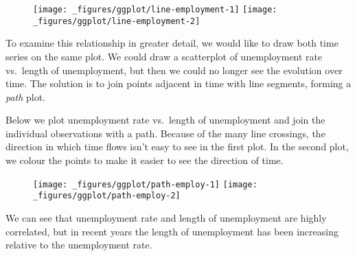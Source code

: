 \begin{figure}[H]
  \texttt{[image: \_figures/ggplot/line-employment-1]}%
  \texttt{[image: \_figures/ggplot/line-employment-2]}
\end{figure}

To examine this relationship in greater detail, we would like to draw
both time series on the same plot. We could draw a scatterplot of
unemployment rate vs.~length of unemployment, but then we could no
longer see the evolution over time. The solution is to join points
adjacent in time with line segments, forming a \emph{path} plot.

Below we plot unemployment rate vs.~length of unemployment and join the
individual observations with a path. Because of the many line crossings,
the direction in which time flows isn't easy to see in the first plot.
In the second plot, we colour the points to make it easier to see the
direction of time.

\begin{Shaded}
\begin{Highlighting}[]
\OperatorTok{/}\StringTok{ }\OperatorTok{+}\StringTok{ }
\StringTok{  }\NormalTok{() }\OperatorTok{+}
\StringTok{  }\NormalTok{()}

\StringTok{ }\OperatorTok{$}\OperatorTok{+}\StringTok{ }
\OperatorTok{/}\StringTok{ }\OperatorTok{+}\StringTok{ }
\StringTok{  }\NormalTok{(} \NormalTok{) }\OperatorTok{+}
\StringTok{  }\NormalTok{(}\NormalTok{(} 
\end{Highlighting}
\end{Shaded}

\begin{figure}[H]
  \texttt{[image: \_figures/ggplot/path-employ-1]}%
  \texttt{[image: \_figures/ggplot/path-employ-2]}
\end{figure}

We can see that unemployment rate and length of unemployment are highly
correlated, but in recent years the length of unemployment has been
increasing relative to the unemployment rate.

